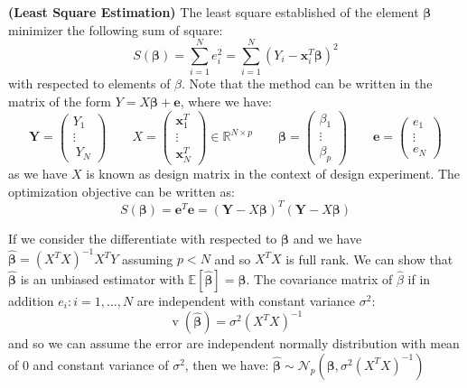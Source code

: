 \begin{definition}{\textbf{(Least Square Estimation)}}
    The least square established of the element $\boldsymbol \beta$ minimizer the following sum of square:
    \begin{equation*}
        S(\boldsymbol \beta) = \sum^N_{i=1}e_i^2 = \sum^N_{i=1}(Y_i - \boldsymbol x_i^T\boldsymbol \beta)^2
    \end{equation*}
    with respected to elements of $\beta$. Note that the method can be written in the matrix of the form $Y = X\boldsymbol \beta + \boldsymbol e$, where we have:
    \begin{equation*}
        \boldsymbol Y = \begin{pmatrix}
            Y_1 \\ \vdots \\\ Y_N
        \end{pmatrix} \qquad X = \begin{pmatrix}
            \boldsymbol x_1^T \\ \vdots \\ \boldsymbol x_N^T
        \end{pmatrix} \in \mathbb{R}^{N\times p} \qquad \boldsymbol \beta = \begin{pmatrix}
            \beta_1 \\ \vdots \\ \beta_p
        \end{pmatrix} \qquad \boldsymbol e = \begin{pmatrix}
            e_1 \\ \vdots \\ e_N
        \end{pmatrix}
    \end{equation*}
    as we have $X$ is known as design matrix in the context of design experiment. The optimization objective can be written as: 
    \begin{equation*}
        S(\boldsymbol \beta) = \boldsymbol e^T\boldsymbol e = (\boldsymbol Y - X\boldsymbol \beta)^T(\boldsymbol Y - X\boldsymbol \beta) 
    \end{equation*}
\end{definition}

\begin{remark}
    If we consider the differentiate with respected to $\boldsymbol \beta$ and we have $\hat{\boldsymbol \beta} = (X^TX)^{-1}X^TY $ assuming $p < N$ and so $X^TX$ is full rank. We can show that $\hat{\boldsymbol \beta}$ is an unbiased estimator with $\mathbb{E}[\hat{\boldsymbol \beta}] = \boldsymbol \beta$. The covariance matrix of $\hat{\beta}$ if in addition $e_i : i = 1,\dots,N$  are independent with constant variance $\sigma^2$:
    \begin{equation*}
        \operatorname{v}(\hat{\boldsymbol \beta}) = \sigma^2(X^TX)^{-1}
    \end{equation*}
    and so we can assume the error are independent normally distribution with mean of $0$ and constant variance of $\sigma^2$, then we have: $\hat{\boldsymbol \beta} \sim \mathcal{N}_p(\boldsymbol\beta, \sigma^2(X^TX)^{-1})$
\end{remark}

